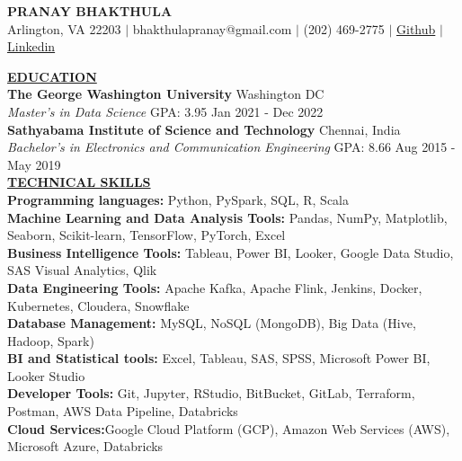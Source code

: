 \documentclass{article}
\begin{document}
\begin{center}
\thispagestyle{empty}
\large \textbf{PRANAY BHAKTHULA\\}
\normalsize Arlington, VA 22203 $\mid$ bhakthulapranay@gmail.com $\mid$ (202) 469-2775 $\mid$ {\href{https://github.com/Pranay-yanarp}{Github}} $\mid$ \href{https://www.linkedin.com/in/pranay-b-844482267/}{Linkedin}    \\
\hrulefill
\end{center}

\noindent \textbf{\underline{EDUCATION}} \\
\textbf{The George Washington University} \hfill Washington DC \\
\textit{Master’s in Data Science} GPA: 3.95 \hfill Jan 2021 - Dec 2022 \\ 
\textbf{Sathyabama Institute of Science and Technology} \hfill Chennai, India \\
\textit{Bachelor’s in Electronics and Communication Engineering}  GPA: 8.66 \hfill Aug 2015 - May 2019 \\



\noindent \textbf{\underline{TECHNICAL SKILLS}} \\
\textbf{Programming languages:} {\small Python, PySpark, SQL, R, Scala} \\
\textbf{Machine Learning and Data Analysis Tools:} {\small Pandas, NumPy, Matplotlib, Seaborn, Scikit-learn, TensorFlow, PyTorch, Excel\\}
\textbf{Business Intelligence Tools:} {\small Tableau, Power BI, Looker, Google Data Studio, SAS Visual Analytics, Qlik\\}
\textbf{Data Engineering Tools:} {\small Apache Kafka, Apache Flink, Jenkins, Docker, Kubernetes, Cloudera, Snowflake\\}
\textbf{Database Management:} {\small MySQL, NoSQL (MongoDB), Big Data (Hive, Hadoop, Spark)} \\
\textbf{BI and Statistical tools:} {\small Excel, Tableau, SAS, SPSS, Microsoft Power BI, Looker Studio} \\
\textbf{Developer Tools:} {\small Git, Jupyter, RStudio, BitBucket, GitLab, Terraform, Postman, AWS Data Pipeline, Databricks\\}
\textbf{Cloud Services:}{\small Google Cloud Platform (GCP), Amazon Web Services (AWS), Microsoft Azure, Databricks}\\
\end{document}
